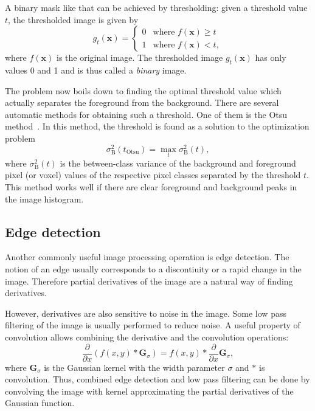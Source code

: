 \documentclass[a4paper,twoside,12pt]{article}
\begin{document}
A binary mask like that can be achieved by thresholding: given a threshold value $t$, the thresholded image is given by
\begin{equation}
    \label{eq:threshold}
    g_t(\mathbf{x}) = \begin{cases}
        0 & \text{where } f(\mathbf{x}) \geq t \\
        1 & \text{where } f(\mathbf{x}) < t,
    \end{cases}
\end{equation}
where $f(\mathbf{x})$ is the original image. The thresholded image $g_t(\mathbf{x})$ has only values 0 and 1 and is thus called a \emph{binary} image.

The problem now boils down to finding the optimal threshold value which actually separates the foreground from the background. There are several automatic methods for obtaining such a threshold. One of them is the Otsu method~\cite{otsu}. In this method, the threshold is found as a solution to the optimization problem
\[
    \sigma_\text{B}^2(t_\text{Otsu}) = \max\limits_t \sigma_\text{B}^2(t),
\]
where $\sigma_\text{B}^2(t)$ is the between-class variance of the background and foreground pixel (or voxel) values of the respective pixel classes separated by the threshold $t$. This method works well if there are clear foreground and background peaks in the image histogram.

\subsection{Edge detection}
Another commonly useful image processing operation is edge detection. The notion of an edge usually corresponds to a discontiuity or a rapid change in the image. Therefore partial derivatives of the image are a natural way of finding derivatives.

However, derivatives are also sensitive to noise in the image. Some low pass filtering of the image is usually performed to reduce noise. A useful property of convolution allows combining the derivative and the convolution operations:
\begin{equation}
    \frac{\partial}{\partial x} (f(x, y) \ast \mathbf{G}_\sigma) =
    f(x, y) \ast \frac{\partial}{\partial x} \mathbf{G}_\sigma,
\end{equation}
where $\mathbf{G}_\sigma$ is the Gaussian kernel with the width parameter $\sigma$ and $\ast$ is convolution. Thus, combined edge detection and low pass filtering can be done by convolving the image with kernel approximating the partial derivatives of the Gaussian function.
\end{document}
